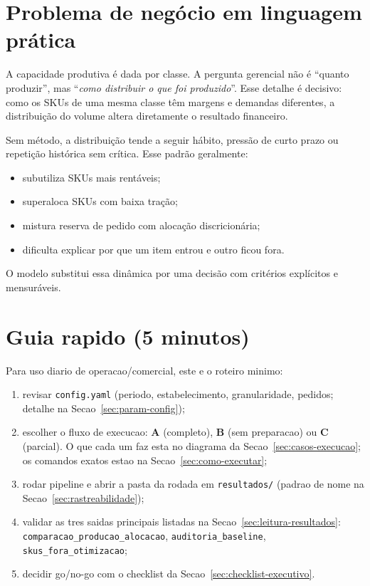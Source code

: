 \documentclass[11pt,a4paper]{article}
\begin{document}
\section{Problema de negócio em linguagem prática}

A capacidade produtiva é dada por classe. A pergunta gerencial não é ``quanto
produzir'', mas ``\textit{como distribuir o que foi produzido}''. Esse detalhe
é decisivo: como os SKUs de uma mesma classe têm margens e demandas diferentes,
a distribuição do volume altera diretamente o resultado financeiro.

Sem método, a distribuição tende a seguir hábito, pressão de curto prazo ou
repetição histórica sem crítica. Esse padrão geralmente:
\begin{itemize}[leftmargin=1.2cm]
    \item subutiliza SKUs mais rentáveis;
    \item superaloca SKUs com baixa tração;
    \item mistura reserva de pedido com alocação discricionária;
    \item dificulta explicar por que um item entrou e outro ficou fora.
\end{itemize}

O modelo substitui essa dinâmica por uma decisão com critérios explícitos e
mensuráveis.

\section{Guia rapido (5 minutos)}
\label{sec:guia-rapido}

Para uso diario de operacao/comercial, este e o roteiro minimo:
\begin{enumerate}[leftmargin=1.2cm]
    \item revisar \texttt{config.yaml} (periodo, estabelecimento, granularidade, pedidos; detalhe na Secao~\ref{sec:param-config});
    \item escolher o fluxo de execucao: \textbf{A} (completo), \textbf{B} (sem preparacao) ou \textbf{C} (parcial). O que cada um faz esta no diagrama da Secao~\ref{sec:casos-execucao}; os comandos exatos estao na Secao~\ref{sec:como-executar};
    \item rodar pipeline e abrir a pasta da rodada em \texttt{resultados/} (padrao de nome na Secao~\ref{sec:rastreabilidade});
    \item validar as tres saidas principais listadas na Secao~\ref{sec:leitura-resultados}: \texttt{comparacao\_producao\_alocacao}, \texttt{auditoria\_baseline}, \texttt{skus\_fora\_otimizacao};
    \item decidir go/no-go com o checklist da Secao~\ref{sec:checklist-executivo}.
\end{enumerate}
\end{document}
